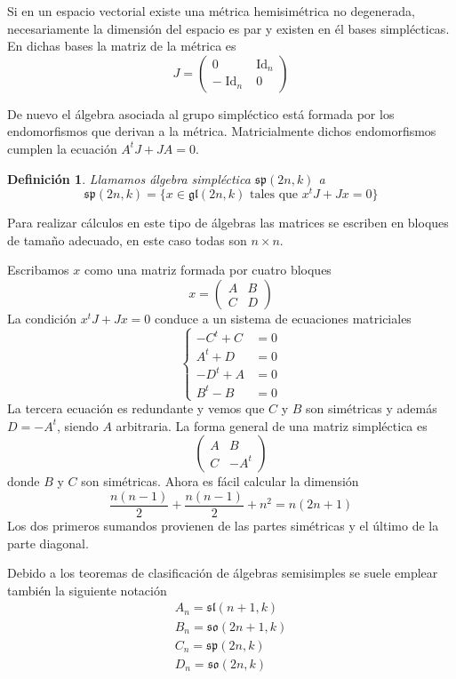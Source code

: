 \documentclass[a4paper,draft,12pt]{scrartcl}
\newtheorem{defi}{Definición}[section]%
\newcommand{\df}[1]{\textsf{\color{blue}#1}}
\DeclareMathOperator{\Id}{Id}%
\begin{document}
Si en un espacio vectorial existe una métrica hemisimétrica no degenerada, necesariamente la dimensión del espacio es par y existen en él bases simplécticas.  En dichas bases la matriz de la métrica es
$$
J=
\begin{pmatrix}
0 & \Id_n \\
-\Id_n& 0
\end{pmatrix}
$$

De nuevo el álgebra asociada al grupo simpléctico está formada por los endomorfismos que derivan a la métrica.  Matricialmente dichos endomorfismos cumplen la ecuación $A^tJ+JA=0$.

\begin{defi}

Llamamos  \df{álgebra simpléctica}  $\mathfrak{sp}(2n,k)$ a 
$$
 \mathfrak{sp}(2n,k)=\{x \in \mathfrak{gl}(2n,k) \text{ tales que }x^t J+Jx=0\}
$$

\end{defi}

Para realizar cálculos en este tipo de álgebras las matrices se escriben en bloques de tamaño adecuado, en este caso todas son $n \times n$.

Escribamos $x$ como una matriz formada por cuatro bloques
$$
x=\begin{pmatrix} A& B \\ C & D\end{pmatrix}
$$
La condición $x^tJ+Jx=0$ conduce a un sistema de ecuaciones matriciales
$$
\begin{cases} 
-C^t+C&=0 \\
A^t+D &=0 \\
-D^t+A &=0 \\
B^t-B&=0
\end{cases}
$$
La tercera ecuación es redundante y vemos que $C$ y $B$ son simétricas y además $D=-A^t$, siendo $A$ arbitraria. La forma general de una matriz simpléctica es
$$
\begin{pmatrix}
A & B \\
C & -A^t
\end{pmatrix}
$$
donde $B$ y $C$ son simétricas.  Ahora es fácil calcular la dimensión
$$
\frac{n(n-1)}{2}+\frac{n(n-1)}{2}+n^2=n(2n+1)
$$
Los dos primeros sumandos provienen de las partes simétricas y el último de la parte diagonal.

\bigskip



Debido a los teoremas de clasificación de álgebras semisimples se suele emplear también la siguiente notación
$$
\begin{array}{l}
A_n= \mathfrak{sl}(n+1,k) \\
B_n = \mathfrak{so} (2n+1,k) \\
C_n= \mathfrak{sp}(2n,k) \\
D_n= \mathfrak{so}(2n,k)
\end{array}
$$
\end{document}
